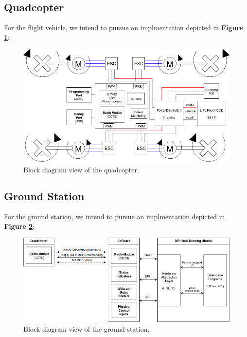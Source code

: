 \documentclass{article}
\begin{document}
\subsection{Quadcopter}

For the flight vehicle, we intend to pursue an implmentation depicted in
\textbf{Figure \ref{fig:quadcopter}}:

\begin{figure}[H]
	\centering
	\includegraphics[width=\linewidth]{../src/im/quadcopter}
	\caption{Block diagram view of the quadcopter.}
	\label{fig:quadcopter}
\end{figure}


\pagebreak

\subsection{Ground Station}

For the ground station, we intend to pursue an implmentation depicted in
\textbf{Figure \ref{fig:ground_station}}:

\begin{figure}[H]
	\centering
	\includegraphics[width=\linewidth]{../src/im/ground_station}
	\caption{Block diagram view of the ground station.}
	\label{fig:ground_station}
\end{figure}
\end{document}
